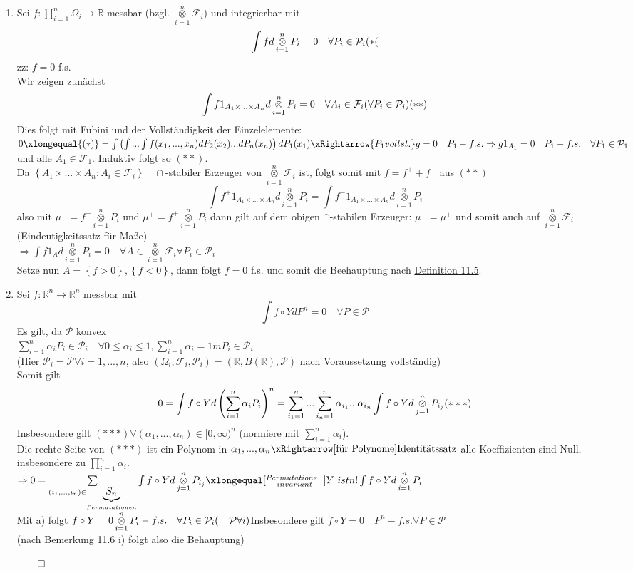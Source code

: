 \documentclass[german,10pt,oneside, fleqn, a4paper]{article}
\newcommand {\R}	{\mathbb{R}}
\newcommand{\Ra}	{\Rightarrow}
\newcommand{\ra}{\rightarrow}
\newcommand{\sm}[2][\infty]{\sum\limits_{#2}^{#1}}
\newcommand{\brc}[1]{\left(#1\right)}
\newcommand{\brac}[1]{\left\lbrace #1\right\rbrace}
\newcommand{\QED}{\begin{flushright}$\qed$\end{flushright}}
\newcommand{\mc}[1]{\mathcal{#1}}
\newcommand{\1}[1]{1_{#1}}
\newcommand{\2}[1]{\1{\brac{#1}}}
\newcommand{\f}{\mc{F}}
\newcommand{\p}{\mc{P}}
\newcommand{\sumi}{\sm[n]{i=1}}
\newcommand{\qf}{\quad\forall}
\DeclareMathOperator*{\kreuz}{\otimes}
\newcommand{\kreuzi}{\kreuz\limits_{i=1}^n}
\begin{document}
\begin{enumerate}[label=(\alph*)]
\item Sei $f:\prod\limits_{i=1}^n\Omega_i\ra\R$ messbar (bzgl. $\kreuz\limits_{i=1}^n\f_i$) und integrierbar mit \[\int fd\kreuz\limits_{i=1}^nP_i=0\qf P_i\in\p_i\hfill (*(\]
zz: $f=0$ f.s.\\
Wir zeigen zunächst\[\int f 1_{A_1\times...\times A_n}d\kreuzi P_i=0\qf A_i\in\f_i(\forall P_i\in\p_i)\hfill(**)\]
Dies folgt mit Fubini und der Vollständigkeit der Einzelelemente:$\\
0\xlongequal{(*)}=\int\brc{\int...\int f(x_1,...,x_n)dP_2(x_2)...dP_n(x_n)}dP_1(x_1)\\
\xRightarrow{P_1 vollst.}g=0\quad P_1-f.s.\Ra g1_{A_1}=0\quad P_1-f.s.\qf P_1\in\p_1$ und alle $A_1\in\f_1$. Induktiv folgt so $(**)$.\\
Da $\brac{A_1\times...\times A_n:A_i\in\f_i}\quad\cap$-stabiler Erzeuger von $\kreuzi\f_i$ ist, folgt somit mit $f=f^++f^-$ aus $(**)$\[
\int f^+1_{A_1\times...\times A_n}d\kreuzi P_i=\int f^-1_{A_1\times...\times A_n}d\kreuzi P_i\]
also  mit $\mu^-=f^-\kreuzi P_i$ und $\mu^+=f^+\kreuzi P_i$ dann gilt auf dem obigen $\cap$-stabilen Erzeuger: $\mu^-=\mu^+$ und somit auch auf $\kreuzi\f_i$ (Eindeutigkeitssatz für Maße)\\
$\Ra \int f1_Ad\kreuzi P_i=0\qf A\in\kreuzi\f_i\forall P_i\in\p_i$\\
Setze nun $A=\brac{f>0},\brac{f<0}$, dann folgt $f=0$ f.s. und somit die Beehauptung nach \hyperref[1.5]{Definition 11.5}.

\item Sei $f:\R^n\ra\R^n$ messbar mit \[
\int f\circ YdP^n=0\qf P\in\p\]
Es gilt, da $\p$ konvex\\
$\sumi \alpha_iP_i\in\p_i\qf0\leq\alpha_i\leq 1,\sumi \alpha_i=1m P_i\in\p_i$\\
(Hier $\p_i=\p\forall i=1,...,n$, also $(\Omega_i,\f_i,\p_i)=(\R,B(\R),\p)$ nach Voraussetzung vollständig)\\
Somit gilt\[0=\int f\circ Yd\brc{\sumi \alpha_iP_i}^n=\sum\limits_{i_1=1}^n...\sum\limits_{i_n=1}^n\alpha_{i_1}...\alpha_{i_n}\int f\circ Yd\kreuz\limits_{j=1}^n P_{i_j}\hfill(***)\]
Insbesondere gilt $(***)\forall(\alpha_1,...,\alpha_n)\in[0,\infty)^n$ (normiere mit $\sumi \alpha_i$).\\
Die rechte Seite von $(***)$ ist ein Polynom in $\alpha_1,...,\alpha_n\\
\xRightarrow[\text{für Polynome}]{\text{Identitätssatz}}$ alle Koeffizienten sind Null, insbesondere zu $\prod\limits_{i=1}^n\alpha_i.$\\
$\Ra 0=\sum\limits_{(i_1,...,i_n)\in \underbrace{S_n}_{Permutationen}}\int f\circ Yd\kreuz\limits_{j=1}^n P_{i_j}\xlongequal[\substack{Permutations-\\invariant}]{Y\ ist}n!\int f\circ Yd\kreuzi P_i$\\
Mit a) folgt $f\circ Y= 0\kreuzi P_i-f.s.\qf P_i\in\p_i(=\p \forall i)\\
$Insbesondere gilt $f\circ Y=0\quad P^n-f.s.\forall P\in\p$\\
(nach Bemerkung 11.6 i) folgt also die Behauptung)\QED
\end{enumerate}
\end{document}
